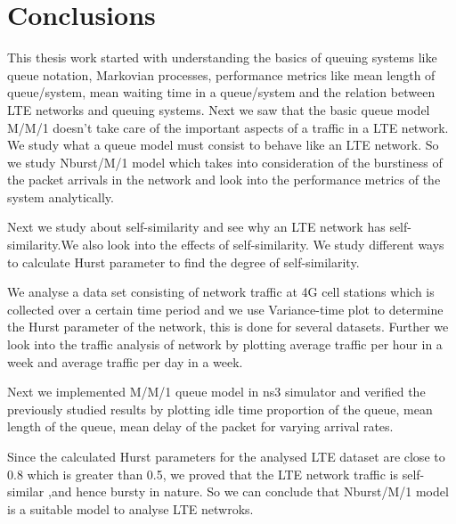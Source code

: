 \chapter{Conclusions}


This thesis work started with understanding the basics of queuing systems like queue notation, Markovian processes, performance metrics like mean length of queue/system, mean waiting time in a queue/system and the relation between LTE networks and queuing systems. Next we saw that the basic queue model M/M/1 doesn't take care of the important aspects of a traffic in a LTE network. We study what a queue model must consist to behave like an LTE network. So we study Nburst/M/1 model which takes into consideration of the burstiness of the packet arrivals in the network and look into the performance metrics of the system analytically.

Next we study about self-similarity and see why an LTE network has self-similarity.We also look into the effects of self-similarity. We study different ways to calculate Hurst parameter to find the degree of self-similarity.

We analyse a data set consisting of network traffic at 4G cell stations which is collected over a certain time period and we use Variance-time plot to determine the Hurst parameter of the network, this is done for several datasets. Further we look into the traffic analysis of network by plotting average traffic per hour in a week and average traffic per day in a week.

Next we implemented M/M/1 queue model in ns3 simulator and verified the previously studied results by plotting idle time proportion of the queue, mean length of the queue, mean delay of the packet for varying arrival rates.

Since the calculated Hurst parameters for the analysed LTE dataset are close to 0.8 which is greater than 0.5, we proved that the LTE network traffic is self-similar ,and hence bursty in nature. So we can conclude that Nburst/M/1 model is a suitable model to analyse LTE netwroks.